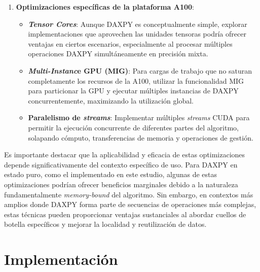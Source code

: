 \begin{enumerate}
                \item \textbf{Optimizaciones específicas de la plataforma A100}:
                
                    \begin{itemize}
                    
                        \item \textbf{\textit{Tensor Cores}}: Aunque DAXPY es conceptualmente simple, explorar implementaciones que aprovechen las unidades tensoras podría ofrecer ventajas en ciertos escenarios, especialmente al procesar múltiples operaciones DAXPY simultáneamente en precisión mixta.
                        
                        \item \textbf{\textit{Multi-Instanc}e GPU (MIG)}: Para cargas de trabajo que no saturan completamente los recursos de la A100, utilizar la funcionalidad MIG para particionar la GPU y ejecutar múltiples instancias de DAXPY concurrentemente, maximizando la utilización global.
                        
                        \item \textbf{Paralelismo de \textit{streams}}: Implementar múltiples \textit{streams} CUDA para permitir la ejecución concurrente de diferentes partes del algoritmo, solapando cómputo, transferencias de memoria y operaciones de gestión.
                        
                    \end{itemize}
                
            \end{enumerate}
            
            Es importante destacar que la aplicabilidad y eficacia de estas optimizaciones depende significativamente del contexto específico de uso. Para DAXPY en estado puro, como el implementado en este estudio, algunas de estas optimizaciones podrían ofrecer beneficios marginales debido a la naturaleza fundamentalmente \textit{memory-bound} del algoritmo. Sin embargo, en contextos más amplios donde DAXPY forma parte de secuencias de operaciones más complejas, estas técnicas pueden proporcionar ventajas sustanciales al abordar cuellos de botella específicos y mejorar la localidad y reutilización de datos.

\newpage

\section{Implementación}

